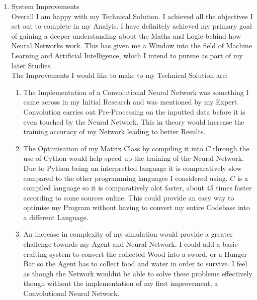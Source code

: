 \begin{flushleft}
\begin{enumerate}
            \vspace{0.5cm}

        \item {\Large System Improvements} \\
            \vspace{0.2cm}
            Overall I am happy with my Technical Solution. I achieved all the objectives I set out to complete in my Analyis. I have definitely achieved
            my primary goal of gaining a deeper understanding about the Maths and Logic behind how Neural Networks work. This has given me a Window into
            the field of Machine Learning and Artificial Intelligence, which I intend to pursue as part of my later Studies. \\
            \vspace{0.2cm}
            The Improvements I would like to make to my Technical Solution are: \\
            \vspace{0.5cm}

            \begin{enumerate}
                \item The Implementation of a Convolutional Neural Network was something I came across in my Initial Research and was mentioned by my Expert.
                Convolution carries out Pre-Processing on the inputted data before it is even touched by the Neural Network. This in theory would increase
                the training accuracy of my Network leading to better Results. \\
                
                \vspace{0.2cm}
                \item The Optimisation of my Matrix Class by compiling it into $C$ through the use of Cython would help speed up the training of the Neural
                Network. Due to Python being an interpretted language it is comparatively slow compared to the other programming languages I considered
                using. $C$ is a compiled language so it is comparatively alot faster, about 45 times faster according to some sources online. This could
                provide an easy way to optimise my Program without having to convert my entire Codebase into a different Language. \\

                \vspace{0.2cm}
                \item An increase in complexity of my simulation would provide a greater challenge towards my Agent and Neural Network. I could add a basic
                crafting system to convert the collected Wood into a sword, or a Hunger Bar so the Agent has to collect food and water in order to survive.
                I feel as though the Network wouldnt be able to solve these problems effectively though without the implementation of my first improvement,
                a Convolutional Neural Network. \\


\end{enumerate}
\end{enumerate}
\end{flushleft}

